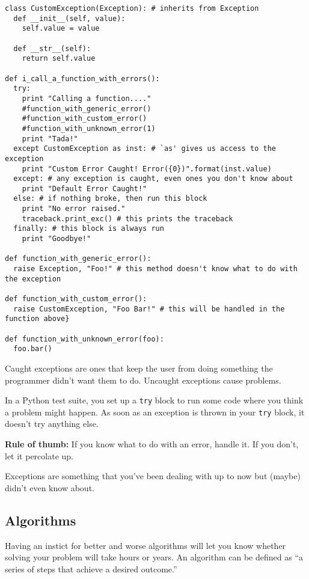 \documentclass[12pt,letter]{article}
\begin{document}
\begin{verbatim}
class CustomException(Exception): # inherits from Exception
  def __init__(self, value):
    self.value = value
  
  def __str__(self):
    return self.value

def i_call_a_function_with_errors():
  try:
    print "Calling a function...."
    #function_with_generic_error()
    #function_with_custom_error()
    #function_with_unknown_error(1)
    print "Tada!"
  except CustomException as inst: # `as' gives us access to the exception
    print "Custom Error Caught! Error({0})".format(inst.value)
  except: # any exception is caught, even ones you don't know about
    print "Default Error Caught!"
  else: # if nothing broke, then run this block
    print "No error raised."
    traceback.print_exc() # this prints the traceback
  finally: # this block is always run
    print "Goodbye!"
  
def function_with_generic_error():
  raise Exception, "Foo!" # this method doesn't know what to do with
the exception
  
def function_with_custom_error():
  raise CustomException, "Foo Bar!" # this will be handled in the
function above}
  
def function_with_unknown_error(foo):
  foo.bar()
\end{verbatim}

Caught exceptions are ones that keep the user from doing something the
programmer didn't want them to do. Uncaught exceptions cause
problems. 

In a Python test suite, you set up a \texttt{try} block to run some
code where you think a problem might happen. As soon as an exception
is thrown in your \texttt{try} block, it doesn't try anything else. 

\textbf{Rule of thumb:} If you know what to do with an error, handle
it. If you don't, let it percolate up. 

Exceptions are something that you've been dealing with up to now but
(maybe) didn't even know about. 

\subsection{Algorithms}
Having an instict for better and worse algorithms will let you know
whether solving your problem will take hours or years.\footnotemark
{} An algorithm can
be defined as ``a series of steps that achieve a desired outcome.''
\end{document}
